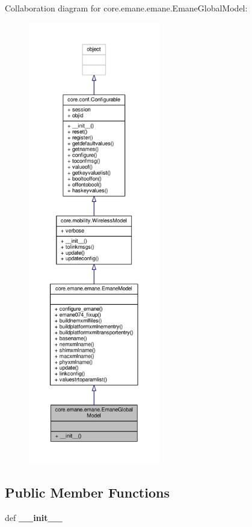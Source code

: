 Collaboration diagram for core.\+emane.\+emane.\+Emane\+Global\+Model\+:
\nopagebreak
\begin{figure}[H]
\begin{center}
\leavevmode
\includegraphics[height=550pt]{classcore_1_1emane_1_1emane_1_1_emane_global_model__coll__graph}
\end{center}
\end{figure}
\subsection*{Public Member Functions}
\begin{DoxyCompactItemize}
\item 
\hypertarget{classcore_1_1emane_1_1emane_1_1_emane_global_model_aada0eb393c927e35be2d604cf549181e}{def {\bfseries \+\_\+\+\_\+init\+\_\+\+\_\+}}\label{classcore_1_1emane_1_1emane_1_1_emane_global_model_aada0eb393c927e35be2d604cf549181e}

\end{DoxyCompactItemize}
